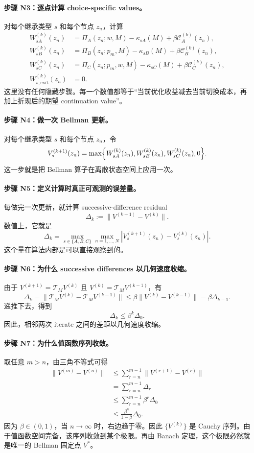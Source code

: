 \paragraph{步骤 N3：逐点计算 choice-specific values。}
对每个继承类型 $s$ 和每个节点 $z_n$，计算
\begin{align*}
W_{sA}^{(k)}(z_n)
&=
\Pi_A(z_n;w,M)-\kappa_{sA}(M)+\beta\mathcal C_A^{(k)}(z_n),\\
W_{sB}^{(k)}(z_n)
&=
\Pi_B(z_n;p_m,M)-\kappa_{sB}(M)+\beta\mathcal C_B^{(k)}(z_n),\\
W_{sC}^{(k)}(z_n)
&=
\Pi_C(z_n;p_m,w,M)-\kappa_{sC}(M)+\beta\mathcal C_C^{(k)}(z_n),\\
W_{s,\mathrm{exit}}^{(k)}(z_n)&=0.
\end{align*}
这里没有任何隐藏步骤。每一个数值都等于“当前优化收益减去当前切换成本，再加上折现后的期望 continuation value”。

\paragraph{步骤 N4：做一次 Bellman 更新。}
对每个继承类型 $s$ 和每个节点 $z_n$，令
\[
V_s^{(k+1)}(z_n)
=
\max\Bigl\{
W_{sA}^{(k)}(z_n),
W_{sB}^{(k)}(z_n),
W_{sC}^{(k)}(z_n),
0
\Bigr\}.
\]
这一步就是把 Bellman 算子在离散状态空间上应用一次。

\paragraph{步骤 N5：定义计算时真正可观测的误差量。}
每做完一次更新，就计算 successive-difference residual
\[
\Delta_k:=\|V^{(k+1)}-V^{(k)}\|.
\]
数值上，它就是
\[
\Delta_k=
\max_{s\in\{A,B,C\}}
\max_{n=1,\dots,N}
\left|V_s^{(k+1)}(z_n)-V_s^{(k)}(z_n)\right|.
\]
这个量在算法内部是可以直接观察到的。

\paragraph{步骤 N6：为什么 successive differences 以几何速度收缩。}
由于 $V^{(k+1)}=\mathcal T_MV^{(k)}$ 且 $V^{(k)}=\mathcal T_MV^{(k-1)}$，有
\[
\Delta_k
=
\|\mathcal T_MV^{(k)}-\mathcal T_MV^{(k-1)}\|
\le \beta\|V^{(k)}-V^{(k-1)}\|
=
\beta\Delta_{k-1}.
\]
递推下去，得到
\[
\Delta_k\le \beta^k\Delta_0.
\]
因此，相邻两次 iterate 之间的差距以几何速度收缩。

\paragraph{步骤 N7：为什么值函数序列收敛。}
取任意 $m>n$，由三角不等式可得
\begin{align*}
\|V^{(m)}-V^{(n)}\|
&\le
\sum_{r=n}^{m-1}\|V^{(r+1)}-V^{(r)}\|\\
&=
\sum_{r=n}^{m-1}\Delta_r\\
&\le
\sum_{r=n}^{m-1}\beta^r\Delta_0\\
&\le
\frac{\beta^n}{1-\beta}\Delta_0.
\end{align*}
因为 $\beta\in(0,1)$，当 $n\to\infty$ 时，右边趋于零。因此 $\{V^{(k)}\}$ 是 Cauchy 序列。由于值函数空间完备，该序列收敛到某个极限。再由 Banach 定理，这个极限必然就是唯一的 Bellman 固定点 $V^*$。

